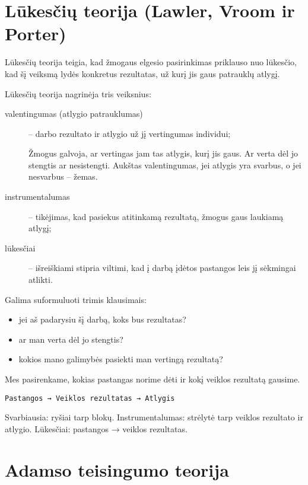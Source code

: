 \section{Lūkesčių teorija (Lawler, Vroom ir Porter)}

Lūkesčių teorija teigia, kad žmogaus elgesio pasirinkimas priklauso nuo
lūkesčio, kad šį veiksmą lydės konkretus rezultatas, už kurį jis
gaus patrauklų atlygį.

Lūkesčių teorija nagrinėja tris veiksnius:
\begin{description}
  \item[valentingumas (atlygio patrauklumas)] – darbo rezultato ir
    atlygio už jį vertingumas individui;
    \begin{note}
      Žmogus galvoja, ar vertingas jam tas atlygis, kurį jis gaus. Ar
      verta dėl jo stengtis ar nesistengti. Aukštas valentingumas,
      jei atlygis yra svarbus, o jei nesvarbus – žemas.
    \end{note}
  \item[instrumentalumas] – tikėjimas, kad pasiekus atitinkamą rezultatą,
    žmogus gaus laukiamą atlygį;
  \item[lūkesčiai] – išreiškiami stipria viltimi, kad į darbą įdėtos
    pastangos leis jį sėkmingai atlikti.
\end{description}

Galima suformuluoti trimis klausimais:
\begin{itemize}
  \item jei aš padarysiu šį darbą, koks bus rezultatas?
  \item ar man verta dėl jo stengtis?
  \item kokios mano galimybės pasiekti man vertingą rezultatą?
\end{itemize}

Mes pasirenkame, kokias pastangas norime dėti ir kokį veiklos rezultatą
gausime.

\begin{verbatim}
Pastangos → Veiklos rezultatas → Atlygis
\end{verbatim}

Svarbiausia: ryšiai tarp blokų. Instrumentalumas: strėlytė tarp veiklos
rezultato ir atlygio. Lūkesčiai: pastangos → veiklos rezultatas.

\section{Adamso teisingumo teorija}

